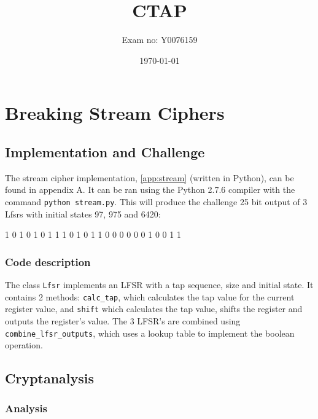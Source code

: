 \documentclass[british,11pt,a4paper]{article}
\begin{document}
\title{CTAP}
\author{Exam no: Y0076159}
\date{\today}
\maketitle
\tableofcontents
\clearpage
\section{Breaking Stream Ciphers}
\subsection{Implementation and Challenge}
The stream cipher implementation, \autoref{app:stream} (written in Python),
can be found in appendix A. It can be ran using the Python 2.7.6
compiler with the command \lstinline{python stream.py}. This will produce the
challenge 25 bit output of 3 Lfsrs with initial states 97, 975 and 6420:

1 0 1 0 1 0 1 1 1 0 1 0 1 1 0 0 0 0 0 0 1 0 0 1 1

\subsubsection{Code description}
The class \lstinline{Lfsr} implements an LFSR with a tap sequence, size and initial state. It contains 2 methods:
\lstinline{calc_tap}, which calculates the tap value for the current register value, and \lstinline{shift} which
calculates the tap value, shifts the register and outputs the register's value. The 3 LFSR's are combined using
\lstinline{combine_lfsr_outputs}, which uses a lookup table to implement the boolean operation.

\subsection{Cryptanalysis}
\subsubsection{Analysis}
\end{document}
